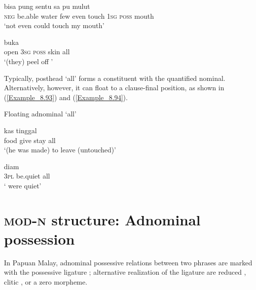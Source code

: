 \ea
\label{Example_8.91}
 {bisa} {} {} {pung} {sentu} {sa} {pu} {mulut}\\ %
 \textsc{neg}  be.able  water  few  even  touch  \textsc{1sg}  \textsc{poss}  mouth\\
 ‘not even  could touch my mouth’ \textstyleExampleSource{[081006-035-CvEx.0050]}
\z

\ea
\label{Example_8.92}
\gll {\ldots} {buka} {} {} {} {}\\ %
  { } open  \textsc{3sg}  \textsc{poss}  skin  all\\
\glt 
‘(they) peel off ’ \textstyleExampleSource{[081029-004-Cv.0047]}
\z



Typically, posthead  ‘all’ forms a constituent with the quantified nominal. Alternatively, however, it can float to a clause-final position, as shown in (\ref{Example_8.93}) and (\ref{Example_8.94}).



\begin{styleExampleTitle}
Floating adnominal   ‘all’
\end{styleExampleTitle}
\ea
\label{Example_8.93}
 {kas} {tinggal} {}\\ %
 food  give  stay  all\\
\glt 
‘(he was made) to leave  (untouched)’ \textstyleExampleSource{[081025-008-Cv.0048]}
\z

\ea
\label{Example_8.94}
 {diam} {}\\ %
 \textsc{3pl}  be.quiet  all\\
\glt
‘ were  quiet’ \textstyleExampleSource{[080922-003-Cv.0095]}
\z


\section[{\footnotesize MOD-N} structure: Adnominal possession]{\textsc{mod-n} structure: Adnominal possession}
\label{Para_8.4}
In Papuan Malay, adnominal possessive relations between two  phrases are marked with the possessive ligature ; alternative realization of the ligature are reduced , clitic , or a zero morpheme.



